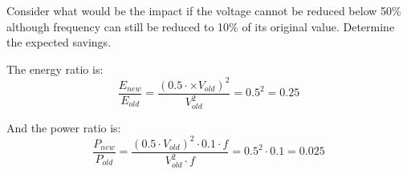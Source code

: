 \begin{acexercise}
\end{acexercise}

Consider what would be the impact if the voltage cannot be reduced below 50\% although
frequency can still be reduced to 10\% of its original value. Determine the expected
savings.

\begin{acsolution}
\end{acsolution}

The energy ratio is:
\[
\frac{E_{new}}{E_{old}} =
\frac{(0.5 \cdot \times V_{old})^2}{V_{old}^2} =
0.5^2 =
0.25
\] 

And the power ratio is:
\[
\frac{P_{new}}{P_{old}} =
\frac{(0.5 \cdot V_{old})^2 \cdot 0.1 \cdot f}{V_{old}^2 \cdot f} =
0.5^2 \cdot 0.1 =
0.025
\]
